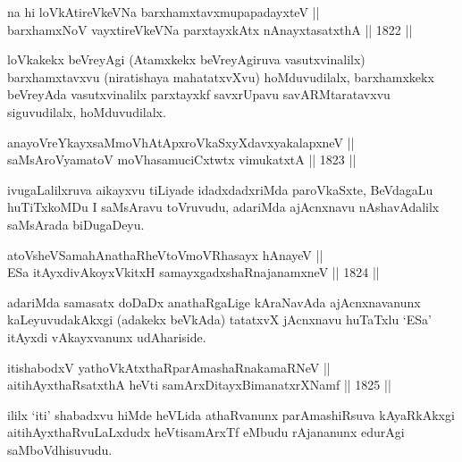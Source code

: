 \begin{shl}
na hi loVkAtireVkeVNa barxhamxtavxmupapadayxteV ||  \\
barxhamxNoV vayxtireVkeVNa parxtayxkAtx nAnayxtasatxthA \hfill || 1822 ||  
\end{shl}

\begin{artha}
loVkakekx beVreyAgi (Atamxkekx beVreyAgiruva vasutxvinalilx)
barxhamxtavxvu (niratishaya mahatatxvXvu) hoMduvudilalx, barxhamxkekx
beVreyAda vasutxvinalilx parxtayxkf savxrUpavu savARMtaratavxvu
siguvudilalx, hoMduvudilalx.
\end{artha}

\begin{shl}
anayoVreYkayxsaMmoVhAtApxroVkaSxyXdavxyakalapxneV || \\
saMsAroV\s yamatoV moVhasamuciCxtwtx vimukatxtA \hfill || 1823 ||  
\end{shl}

\begin{artha}
ivugaLalilxruva aikayxvu tiLiyade idadxdadxriMda paroVkaSxte,
BeVdagaLu huTiTxkoMDu I saMsAravu toVruvudu, adariMda ajAcnxnavu
nAshavAdalilx saMsArada biDugaDeyu.
\end{artha}

\begin{shl}
atoV\s sheVSamahAnathaRheVtoVmoVRhasayx hAnayeV || \\
ESa itAyxdivAkoyxVkitxH samayxgadxshaRnajanamxneV \hfill || 1824 ||  
\end{shl}

\begin{artha}
adariMda samasatx doDaDx anathaRgaLige kAraNavAda ajAcnxnavanunx
kaLeyuvudakAkxgi (adakekx beVkAda) tatatxvX jAcnxnavu huTaTxlu `ESa'
itAyxdi vAkayxvanunx udAhariside.
\end{artha}


\begin{shl}
itishabodxV yathoVkAtxthaRparAmashaRnakamaRNeV || \\
aitihAyxthaRsatxthA heVti samArxDitayxBimanatxrXNamf \hfill || 1825 || 
\end{shl}

\begin{artha}
ililx `iti' shabadxvu hiMde heVLida athaRvanunx parAmashiRsuva
kAyaRkAkxgi aitihAyxthaRvuLaLxdudx heVtisamArxTf eMbudu rAjananunx
edurAgi saMboVdhisuvudu.
\end{artha}

